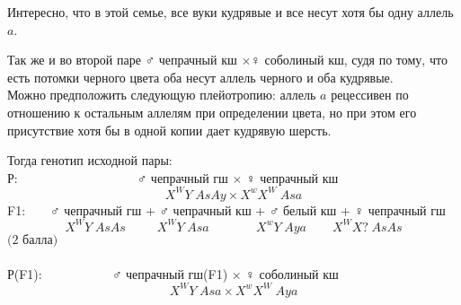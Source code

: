 Интересно, что в этой семье, все вуки кудрявые и все несут хотя бы одну аллель $a$.

Так же и во второй паре $\male$ чепрачный кш $\times\female$ соболиный кш, судя по тому, что есть потомки черного цвета оба несут  аллель черного и оба кудрявые.\\ Можно предположить следующую плейотропию: аллель $a$ рецессивен по отношению к остальным аллелям при определении цвета, но при этом его присутствие хотя бы в одной копии дает кудрявую шерсть.

Тогда генотип исходной пары:\\
Р:$\hspace{110pt}$ $\male$ чепрачный гш $\times$ $\female$ чепрачный кш
$$X^WY\hspace{3pt}AsAy \times X^wX^W\hspace{3pt}Asa$$
F1:$\hspace{20pt}$ $\male$ чепрачный гш + $\male$ чепрачный кш + $\male$ белый кш + $\female$ чепрачный гш
$$X^WY\hspace{3pt}AsAs\hspace{30pt}X^WY\hspace{3pt}Asa\hspace{10pt}\hspace{35pt}X^wY\hspace{3pt}Aya\hspace{25pt}X^WX?\hspace{3pt}AsAs$$
$\textit{(2 балла)}$\\\\
Р(F1):$\hspace{63pt}$ $\male$ чепрачный гш(F1) $\times$ $\female$ соболиный кш
$$X^WY\hspace{3pt}Asa \times X^wX^W\hspace{3pt}Aya$$

